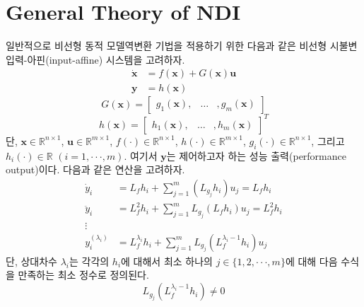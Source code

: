\documentclass[a4paper, 12pt]{report}
\begin{document}
	\section{General Theory of NDI}
	
	일반적으로 비선형 동적 모델역변환 기법을 적용하기 위한 다음과 같은 비선형 시불변 입력-아핀(input-affine) 시스템을 고려하자.
	\begin{equation}\label{Eq:NDI_sys}
		\begin{split}
			\dot{\mathbf{x}} &= f(\mathbf{x}) + G(\mathbf{x})\mathbf{u} \\
			\mathbf{y} &= h(\mathbf{x})
		\end{split}
	\end{equation}
	\begin{equation}\label{Eq:InputMTRX}
		G(\mathbf{x}) =
		\begin{bmatrix}
			g_{1}(\mathbf{x}), & \dots & ,g_{m}(\mathbf{x})
		\end{bmatrix}
	\end{equation}
	\begin{equation}\label{Eq:outputMTRX}
		h(\mathbf{x}) =
		\begin{bmatrix}
			h_{1}(\mathbf{x}), & \dots & ,h_{m}(\mathbf{x})
		\end{bmatrix}^{T}
	\end{equation}
	단, $\mathbf{x} \in \mathbb{R}^{n\times1}$, $\mathbf{u} \in \mathbb{R}^{m\times1}$, $f(\cdot) \in \mathbb{R}^{n\times1}$, $h(\cdot) \in \mathbb{R}^{m\times1}$, $g_{i}(\cdot) \in \mathbb{R}^{n\times1}$, 그리고 $h_{i}(\cdot) \in \mathbb{R}\,\,(i=1,\cdot\cdot\cdot,m)$. 여기서 $\mathbf{y}$는 제어하고자 하는 성능 출력(performance output)이다. 다음과 같은 연산을 고려하자.
	\begin{equation}\label{Eq:output_dere}
		\begin{split}
			\dot{y}_{i} &= L_{f}h_{i} + \sum_{j=1}^{m}( L_{g_{j}}h_{i} )u_{j} = L_{f}h_{i} \\
			\ddot{y}_{i} &= L_{f}^{2}h_{i} + \sum_{j=1}^{m}L_{g_{j}}( L_{f}h_{i} )u_{j} = L_{f}^{2}h_{i} \\
			\vdots  \\
			y_{i}^{(\lambda_{i})} &= L_{f}^{\lambda_{i}}h_{i} + \sum_{j=1}^{m}L_{g_{j}}( L_{f}^{\lambda_{i}-1}h_{i} )u_{j}
		\end{split}
	\end{equation}
	단, 상대차수 $\lambda_{i}$는 각각의 $h_{i}$에 대해서 최소 하나의 $j \in \{1,2,\cdot\cdot\cdot,m\}$에 대해 다음 수식을 만족하는 최소 정수로 정의된다.
	\begin{equation}\label{Eq:rela_deg_cond}
		L_{g_{j}}( L_{f}^{\lambda_{i}-1}h_{i} ) \neq 0
	\end{equation}
\end{document}
